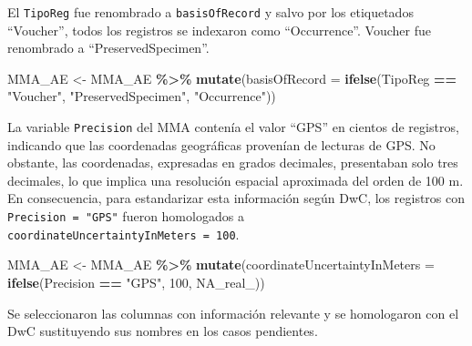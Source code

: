 \documentclass[sn-apa,pdflatex]{sn-jnl}
\newenvironment{Shaded}{\begin{snugshade}}{\end{snugshade}}
\newcommand{\AttributeTok}[1]{\textcolor[rgb]{0.13,0.29,0.53}{#1}}
\newcommand{\ConstantTok}[1]{\textcolor[rgb]{0.56,0.35,0.01}{#1}}
\newcommand{\DecValTok}[1]{\textcolor[rgb]{0.00,0.00,0.81}{#1}}
\newcommand{\FunctionTok}[1]{\textcolor[rgb]{0.13,0.29,0.53}{\textbf{#1}}}
\newcommand{\NormalTok}[1]{#1}
\newcommand{\OtherTok}[1]{\textcolor[rgb]{0.56,0.35,0.01}{#1}}
\newcommand{\SpecialCharTok}[1]{\textcolor[rgb]{0.81,0.36,0.00}{\textbf{#1}}}
\newcommand{\StringTok}[1]{\textcolor[rgb]{0.31,0.60,0.02}{#1}}
\begin{document}
El \texttt{TipoReg} fue renombrado a \texttt{basisOfRecord} y salvo por
los etiquetados ``Voucher'', todos los registros se indexaron como
``Occurrence''. Voucher fue renombrado a ``PreservedSpecimen''.

\begin{Shaded}
\begin{Highlighting}[]
\NormalTok{MMA\_AE }\OtherTok{\textless{}{-}}\NormalTok{ MMA\_AE }\SpecialCharTok{\%\textgreater{}\%}
    \FunctionTok{mutate}\NormalTok{(}\AttributeTok{basisOfRecord =} \FunctionTok{ifelse}\NormalTok{(TipoReg }\SpecialCharTok{==} \StringTok{"Voucher"}\NormalTok{, }\StringTok{"PreservedSpecimen"}\NormalTok{,}
        \StringTok{"Occurrence"}\NormalTok{))}
\end{Highlighting}
\end{Shaded}

La variable \texttt{Precision} del MMA contenía el valor ``GPS'' en
cientos de registros, indicando que las coordenadas geográficas
provenían de lecturas de GPS. No obstante, las coordenadas, expresadas
en grados decimales, presentaban solo tres decimales, lo que implica una
resolución espacial aproximada del orden de 100 m. En consecuencia, para
estandarizar esta información según DwC, los registros con
\texttt{Precision\ =\ "GPS"} fueron homologados a
\texttt{coordinateUncertaintyInMeters\ =\ 100}.

\begin{Shaded}
\begin{Highlighting}[]
\NormalTok{MMA\_AE }\OtherTok{\textless{}{-}}\NormalTok{ MMA\_AE }\SpecialCharTok{\%\textgreater{}\%}
    \FunctionTok{mutate}\NormalTok{(}\AttributeTok{coordinateUncertaintyInMeters =} \FunctionTok{ifelse}\NormalTok{(Precision }\SpecialCharTok{==}
        \StringTok{"GPS"}\NormalTok{, }\DecValTok{100}\NormalTok{, }\ConstantTok{NA\_real\_}\NormalTok{))}
\end{Highlighting}
\end{Shaded}

Se seleccionaron las columnas con información relevante y se homologaron
con el DwC sustituyendo sus nombres en los casos pendientes.
\end{document}
